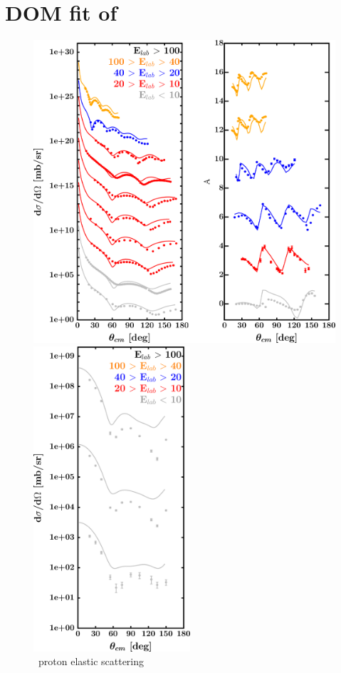 \section{DOM fit of \niFour}
\label{ni64DOMOutput}
\begin{figure}[hbtp]
    \centering
    \begin{minipage}{0.47\textwidth}
        \centering
        \includegraphics[width=\textwidth]{figures/ni64_protonElastic.png}
        \caption*{\niFour\ proton elastic scattering}
        \label{DOMFitData_ni64_proton_elastic}
    \end{minipage}\hspace{6pt}
    \begin{minipage}{0.47\textwidth}
        \centering
        \includegraphics[width=0.52\textwidth]{figures/ni64_neutronElastic.png}

\end{minipage}
\end{figure}
